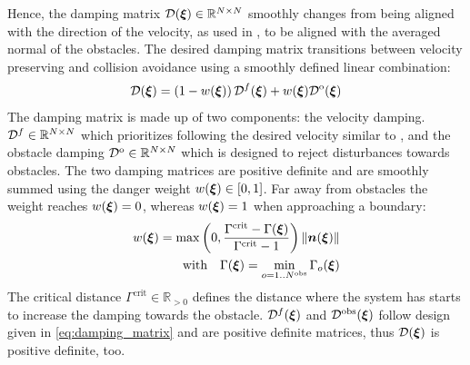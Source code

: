 Hence, the damping matrix $\mathcal{D}(\boldsymbol{\xi}) \in \mathbb{R}^{N \times N}$ smoothly changes from being aligned with the direction of the velocity, as used in \parencite{kronander2015passive}, to be aligned with the averaged normal of the obstacles. The desired damping matrix transitions between velocity preserving and collision avoidance using a smoothly defined linear combination:
\begin{equation}
    \matd D(\vecs\xi) = \left(1 - w(\vecs\xi) \right) {\matd D^{f}}(\vecs\xi) + w(\vecs\xi)  {\matd D^{\mathrm{o}}}(\vecs\xi) \label{eq:damping_summation}
\end{equation}
The damping matrix is made up of two components: the velocity damping. $\mathcal{D}^f \in \mathbb{R}^{N \times N}$ which prioritizes following the desired velocity similar to \parencite{kronander2015passive}, and the obstacle damping $\mathcal{D}^{\mathrm{o}} \in \mathbb{R}^{N \times N}$ which is designed to reject disturbances towards obstacles. The two damping matrices are positive definite and are smoothly summed using the danger weight $w(\boldsymbol{\xi}) \in [0, 1]$. Far away from obstacles the weight reaches $w(\boldsymbol{\xi}) = 0$, whereas $w(\boldsymbol{\xi}) = 1$ when approaching a boundary:
\begin{equation}
  \begin{split}
w(\vecs\xi) =
\max \left(0,  \frac{\Gamma^{\mathrm{crit}} - \Gamma(\vecs\xi)}{\Gamma^{\mathrm{crit}} - 1} \right) \| \vecs n(\vecs \xi) \| \\
\text{with} \quad
\Gamma(\vecs\xi) = \min_{o = 1..N^{\mathrm{obs}}} \Gamma_o(\vecs\xi)
\end{split}
\label{eq:weight_function}
\end{equation}
The critical distance $\Gamma^{\mathrm{crit}} \in \mathbb{R}_{>0}$ defines the distance where the system has starts to increase the damping towards the obstacle.
${\mathcal{D}^f}(\boldsymbol{\xi})$ and $\mathcal{D^{\mathrm{obs}}}(\boldsymbol{\xi})$ follow design given in \eqref{eq:damping_matrix} and are positive definite matrices, thus $\mathcal{D}(\boldsymbol{\xi})$ is positive definite, too.

